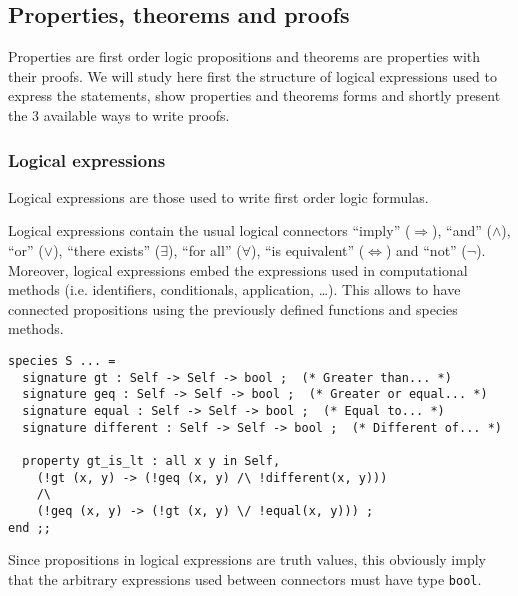 \subsection{Properties, theorems and proofs}
\label{properties-theorems-proofs}

Properties are first order logic propositions and theorems are
properties with their proofs. We will study here first the structure
of logical expressions used to express the statements, show properties
and theorems forms and shortly present the 3 available ways to write
proofs.



\subsubsection{Logical expressions}
\label{logical-expressions}
Logical expressions are those used to write first order logic
formulas.
\begin{syn}
 \is
        
     \tok{,} 
\alt {}   
     \tok{,} 
\alt {} \tok{->} 
\alt {} \tok{<->} 
\alt {} \tok{/\backslash} 
\alt {} \tok{\backslash/} 
\alt \tok{\tilde} 
\alt {}
\alt \tok{(}  \tok{)}
\end{syn}


 Logical expressions contain the usual logical connectors ``imply''
($\Rightarrow$), ``and'' ($\wedge$), ``or'' ($\vee$), ``there exists''
($\exists$), ``for all'' ($\forall$), ``is equivalent''
($\Leftrightarrow$) and ``not'' ($\neg$). Moreover, logical
expressions embed the {\focal} expressions used in computational
methods (i.e. identifiers, conditionals, application, \ldots). This
allows to have connected propositions using the previously defined
functions and species methods.
{\scriptsize
\begin{lstlisting}
species S ... =
  signature gt : Self -> Self -> bool ;  (* Greater than... *)
  signature geq : Self -> Self -> bool ;  (* Greater or equal... *)
  signature equal : Self -> Self -> bool ;  (* Equal to... *)
  signature different : Self -> Self -> bool ;  (* Different of... *)

  property gt_is_lt : all x y in Self,
    (!gt (x, y) -> (!geq (x, y) /\ !different(x, y)))
    /\
    (!geq (x, y) -> (!gt (x, y) \/ !equal(x, y))) ;
end ;;
\end{lstlisting}
}
Since  propositions in logical expressions are truth values, this
obviously imply that the arbitrary expressions used between connectors
must have type {\tt bool}.



